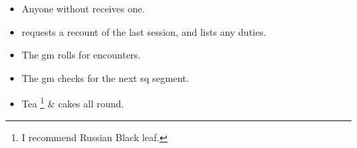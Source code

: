 
\begin{itemize}
  \item
  Anyone without  receives one.
  \item
   requests a recount of the last session, and lists any duties.
  \item
  The \gls{gm} rolls for encounters.
  \item
  The \gls{gm} checks for the next \gls{sq} \gls{segment}.
  \item
  Tea%
  \footnote{I recommend Russian Black leaf.}
  \& cakes all round.
\end{itemize}
